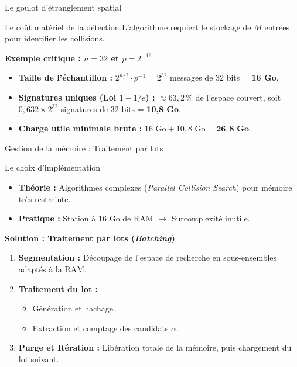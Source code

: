 \begin{frame}{Le goulot d'étranglement spatial}

    \begin{block}{Le coût matériel de la détection}
        L'algorithme requiert le stockage de $M$ entrées pour identifier les collisions.
    \end{block}

    \vspace{0.4cm}
    \textbf{Exemple critique : $n=32$ et $p=2^{-16}$}
    \vspace{0.2cm}

    \begin{itemize}
        \item \textbf{Taille de l'échantillon :} $2^{n/2} \cdot p^{-1} = 2^{32}$ messages de 32 bits = \textbf{16 Go}.
        \item \textbf{Signatures uniques (Loi $1 - 1/e$) :} $\approx 63,2\,\%$ de l'espace couvert, soit $0,632 \times 2^{32}$ signatures de 32 bits = \textbf{10,8 Go}.
        \item \textbf{Charge utile minimale brute :} $16 \text{ Go} + 10,8 \text{ Go} = \mathbf{26,8 \text{ Go}}$.
    \end{itemize}

\end{frame}

\begin{frame}{Gestion de la mémoire : Traitement par lots}

    \begin{block}{Le choix d'implémentation}
        \begin{itemize}
            \item \textbf{Théorie :} Algorithmes complexes (\textit{Parallel Collision Search}) pour mémoire très restreinte.
            \item \textbf{Pratique :} Station à 16 Go de RAM $\rightarrow$ Surcomplexité inutile.
        \end{itemize}
    \end{block}

    \vspace{0.4cm}
    \textbf{Solution : Traitement par lots (\textit{Batching})}
    \vspace{0.2cm}

    \begin{enumerate}
        \item \textbf{Segmentation :} Découpage de l'espace de recherche en sous-ensembles adaptés à la RAM.
        \item \textbf{Traitement du lot :} 
        \begin{itemize}
            \item Génération et hachage.
            \item Extraction et comptage des candidats $\alpha$.
        \end{itemize}
        \item \textbf{Purge et Itération :} Libération totale de la mémoire, puis chargement du lot suivant.
    \end{enumerate}

\end{frame}